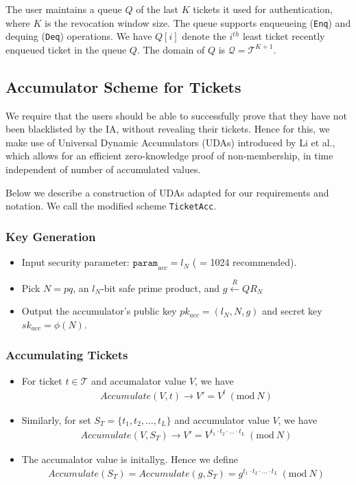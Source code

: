 \documentclass[12pt]{article}
\newcommand{\rIn}{\xleftarrow{R}}
\newcommand{\Mod}[1]{\ (\mathrm{mod}\ #1)}
\begin{document}
\par The user maintains a queue $Q$ of the last $K$ tickets it used for authentication, where $K$ is the revocation window size. The queue supports enqueueing (\texttt{Enq}) and dequing (\texttt{Deq}) operations. We have $Q[i]$ denote the $i^{th}$ least ticket recently enqueued ticket in the queue $Q$. The domain of $Q$ is $\mathcal{Q} = \mathcal{T}^{K+1}$.


\subsection{Accumulator Scheme for Tickets}
We require that the users should be able to successfully prove that they have not been blacklisted by the IA, without revealing their tickets. Hence for this, we make use of Universal Dynamic Accumulators (UDAs) introduced by Li et al.\cite*{Li}, which allows for an efficient zero-knowledge proof of non-membership, in time independent of number of accumulated values. \\

\par Below we describe a construction of UDAs adapted for our requirements and notation. We call the modified scheme \texttt{TicketAcc}.

\subsubsection*{Key Generation}
\begin{itemize}
	\item Input security parameter: $\texttt{param}_{acc} = l_N$ ( = 1024 recommended).
	\item Pick $N = pq$, an $l_N$-bit safe prime product, and $g \rIn QR_N$
	\item Output the accumulator's public key $pk_{acc} = (l_N, N, g)$ and secret key $sk_{acc} = \phi(N)$.
\end{itemize}

\subsubsection*{Accumulating Tickets}
\begin{itemize}
	\item For ticket $t \in \mathcal{T}$ and accumalator value $V$, we have
		\begin{align} Accumulate(V, t) \rightarrow V' = V^t \Mod{N} \end{align}
	\item Similarly, for set $S_T = \{t_1, t_2, \dots, t_L \}$ and accumulator value $V$, we have
		\begin{align} Accumulate(V, S_T) \rightarrow V' = V^{t_1 \cdot t_2 \cdot \dots \cdot t_L} \Mod{N} \end{align}
	\item The accumalator value is initallyg. Hence we define 
		\begin{align} Accumulate(S_T) = Accumulate(g, S_T) = g^{t_1 \cdot t_2 \cdot \dots \cdot t_L} \Mod{N} \end{align}
\end{itemize}
\end{document}
